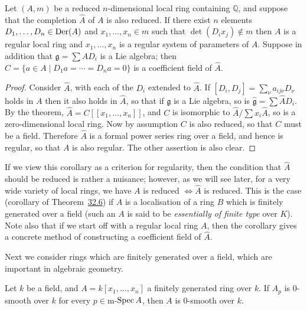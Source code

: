 \begin{corollary*}
Let $(A, m)$ be a reduced $n$-dimensional local ring containing $\mathbb{Q}$, and suppose
that the completion $\hat{A}$ of $A$ is also reduced. If there exist $n$ elements
$D_1, \ldots, D_n \in \operatorname{Der}(A)$ and $x_1, \ldots, x_n \in m$ such that
$\det(D_ix_j) \notin m$ then $A$ is a regular local ring and $x_1, \ldots, x_n$ is a regular
system of parameters of $A$. Suppose in addition that $\mathfrak{g} = \sum AD_i$ is a Lie
algebra; then $C = \{a \in A \mid D_1a = \cdots = D_na = 0\}$ is a coefficient field of
$\hat{A}$.
\end{corollary*}

\begin{proof}
Consider $\hat{A}$, with each of the $D_i$ extended to $\hat{A}$. If
$[D_i, D_j] = \sum_\nu a_{ij\nu}D_\nu$ holds in $A$ then it also holds in $\hat{A}$, so that if
$\mathfrak{g}$ is a Lie algebra, so is $\hat{\mathfrak{g}} = \sum \hat{A}D_i$. By the theorem,
$\hat{A} = C[[x_1, \ldots, x_n]]$, and $C$ is isomorphic to $\hat{A}/\sum x_i\hat{A}$, so is a
zero-dimensional local ring. Now by assumption $C$ is also reduced, so that $C$
must be a field. Therefore $\hat{A}$ is a formal power series ring over a field, and
hence is regular, so that $A$ is also regular. The other assertion is also clear.
\end{proof}

\begin{remark}
If we view this corollary as a criterion for regularity, then the condition that
$\hat{A}$ should be reduced is rather a nuisance; however, as we will see later, for
a very wide variety of local rings, we have $A$ is reduced $\iff \hat{A}$ is reduced.
This is the case (corollary of Theorem~\hyperref[thm:32.6]{32.6}) if $A$ is a localisation of a ring
$B$ which is finitely generated over a field (such an $A$ is said to be
\emph{essentially of finite type} over $K$). Note also that if we start off with a
regular local ring $A$, then the corollary gives a concrete method of
constructing a coefficient field of $\hat{A}$.
\end{remark}

Next we consider rings which are finitely generated over a field, which are
important in algebraic geometry.

\begin{theorem}\label{thm:30.2}
Let $k$ be a field, and $A = k[x_1, \ldots, x_n]$ a finitely generated ring over $k$. If
$A_p$ is 0-smooth over $k$ for every $p \in \mathrm{m}$-$\operatorname{Spec} A$, then $A$ is 0-smooth over
$k$.
\end{theorem}

